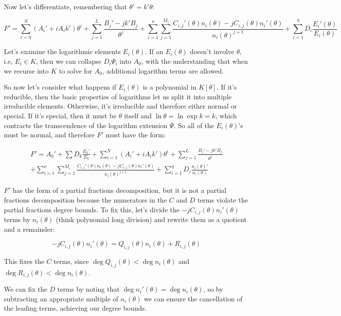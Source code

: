 Now let's differentiate, remembering that $\theta' = k'\theta$:

$$F' = \sum_{i=0}^N (A_i' + i A_i k' )\theta^i
  + \sum_{j=1}^{L} \frac{B_{j}' - j k' B_{j}}{\theta^j}
  + \sum_{i=1}^\nu \sum_{j=1}^{M_i} \frac{C_{i,j}'(\theta) n_i(\theta) - j C_{i,j}(\theta) n_i'(\theta) }{n_i(\theta)^{j+1}}
  + \sum_{i=1}^\eta D_i \frac{E_i'(\theta)}{E_i(\theta)}$$

Let's examine the logarithmic elements $E_i(\theta)$.  If an $E_i(\theta)$ doesn't involve $\theta$, i.e, $E_i \in K$,
then we can collapse $D_i \Psi_i$ into $A_0$, with the understanding that when we recurse
into $K$ to solve for $A_0$, additional logarithm terms are allowed.

So now let's consider what happens if $E_i(\theta)$ is a polynomial in $K[\theta]$.  If it's reducible, then
the basic properties of logarithms let us split it into multiple irreducible elements.
Otherwise, it's irreducible and therefore either normal or special.  If it's special, then it
must be $\theta$ itself and $\ln \theta = \ln \exp k = k$, which contracts the
transcendence of the logarithm extension $\Psi$.
So all of the $E_i(\theta)$'s must be normal, and therefore $F'$ must have the form:

\begin{multline*}
F' = A_0' + \sum D_k \frac{E_k'}{E_k} + \sum_{i=1}^N (A_i' + i A_i k' )\theta^i
  + \sum_{j=1}^{L} \frac{B_{j}' - j k' B_{j}}{\theta^j} \\
  + \sum_{i=1}^\nu \sum_{j=1}^{M_i} \frac{C_{i,j}'(\theta) n_i(\theta) - j C_{i,j}(\theta) n_i'(\theta) }{n_i(\theta)^{j+1}}
  + \sum_{i=1}^\eta D_i \frac{n_i(\theta)'}{n_i(\theta)}
\end{multline*}

$F'$ has the form of a partial fractions decomposition, but it is not
a partial fractions decomposition because the numerators in the $C$
and $D$
terms violate the partial fractions degree bounds.  To fix this, let's
divide the $-jC_{i,j}(\theta)n_i'(\theta)$ terms by $n_i(\theta)$
(think polynomial long division) and rewrite them as a quotient
and a remainder:

$$-jC_{i,j}(\theta)n_i'(\theta) = Q_{i,j}(\theta) n_i(\theta) + R_{i,j}(\theta)$$

This fixes the $C$ terms, since $\deg Q_{i,j}(\theta) < \deg n_i(\theta)$
and $\deg R_{i,j}(\theta) < \deg n_i(\theta)$.

We can fix the $D$ terms by noting that $\deg n_i'(\theta) = \deg n_i(\theta)$,
so by subtracting an appropriate multiple of $n_i(\theta)$
we can ensure the cancellation of the leading terms,
achieving our degree bounds.

